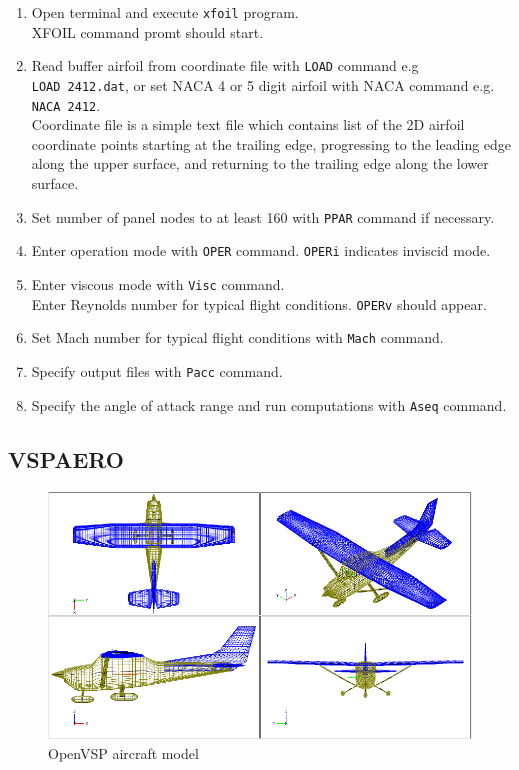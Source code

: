\begin{enumerate}
  \item Open terminal and execute \texttt{xfoil} program. \\
  XFOIL command promt should start.
  \item Read buffer airfoil from coordinate file with \texttt{LOAD} command e.g \texttt{LOAD~2412.dat}, or set NACA 4 or 5 digit airfoil with NACA command e.g. \texttt{NACA~2412}. \\
  Coordinate file is a simple text file which contains list of the 2D airfoil coordinate points starting at the trailing edge, progressing to the leading edge along the upper surface, and returning to the trailing edge along the lower surface.
  \item Set number of panel nodes to at least 160 with \texttt{PPAR} command if necessary.
  \item Enter operation mode with \texttt{OPER} command. \texttt{OPERi} indicates inviscid mode.
  \item Enter viscous mode with \texttt{Visc} command. \\
  Enter Reynolds number for typical flight conditions. \texttt{OPERv} should appear.
  \item Set Mach number for typical flight conditions with \texttt{Mach} command.
  \item Specify output files with \texttt{Pacc} command.
  \item Specify the angle of attack range and run computations with \texttt{Aseq} command.
\end{enumerate}

\subsection{VSPAERO}

\begin{figure}
  \centering
  \includegraphics[width=120mm]{images/vspaero_01.eps}
  \caption{OpenVSP aircraft model}
\end{figure}

